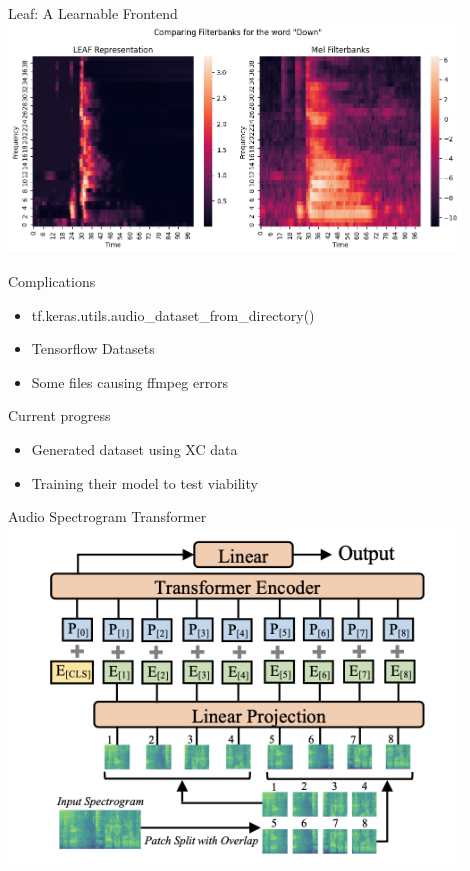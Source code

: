 \begin{frame}{Leaf: A Learnable Frontend}
    \centering
    \includegraphics[height=0.7\textheight,width=0.9\textwidth,keepaspectratio]{images/leaf_demo.png}
\end{frame}
    

\begin{frame}{Complications}
    \begin{itemize}
        \item tf.keras.utils.audio\_dataset\_from\_directory()
        \item Tensorflow Datasets
        \item Some files causing ffmpeg errors
    \end{itemize}
\end{frame}

\begin{frame}{Current progress}
    \begin{itemize}
        \item Generated dataset using XC data
        \item Training their model to test viability
    \end{itemize}
\end{frame}


\begin{frame}{Audio Spectrogram Transformer}
    \centering
    \includegraphics[height=0.7\textheight,width=0.9\textwidth,keepaspectratio]{images/ast.png}
\end{frame}


